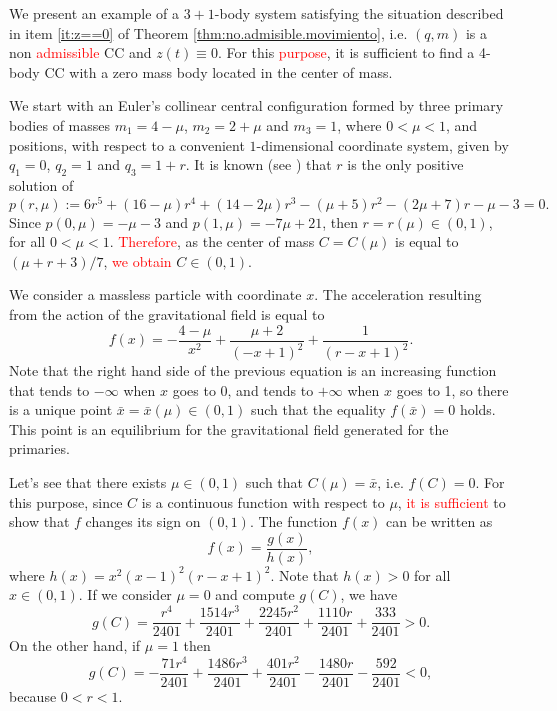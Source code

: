\documentclass[smallcondensed]{svjour3}
\begin{document}
\begin{example}
 We present an example of a $3+1$-body system satisfying the situation described in  item \ref{it:z==0} of Theorem \ref{thm:no.admisible.movimiento}, i.e. $(q,m)$ is a non \textcolor{red}{admissible} CC and $z(t)\equiv 0$. For this \textcolor{red}{purpose}, it is sufficient to find a 4-body CC with a zero mass body located in the center of mass.

 We start with an Euler's collinear central configuration formed by three primary bodies of masses $m_1 = 4-\mu$, $m_2 = 2 + \mu$ and $m_3 = 1$, where $0<\mu<1$, and positions, with respect to a convenient $1$-dimensional coordinate system,  given by $q_1 = 0$, $q_2 = 1$ and $q_3 = 1 + r$. It is known (see \cite{Moeckel:2014}) that $r$ is the only positive solution of
\[
p(r,\mu):=6 r^{5} +\left(16- \mu \right) r^{4}  +  \left( 14- 2 \mu \right) r^{3}- \left( \mu + 5\right)  r^{2}-\left( 2 \mu + 7\right) r - \mu - 3=0.
\]
Since  $p(0,\mu)=-\mu-3$ and $p(1,\mu)=-7\mu+21$, then $r=r(\mu)\in (0,1)$, for all $0<\mu<1$.
\textcolor{red}{Therefore}, as the center of mass $C=C(\mu)$ is equal to $(\mu+r+3)/7$, \textcolor{red}{we obtain} $C\in (0,1)$.

We consider a massless particle with coordinate $x$. The acceleration resulting from the action of the gravitational field is equal to
\[
f(x)= - \frac{4-\mu }{x^{2}}+\frac{\mu + 2}{\left(- x + 1\right)^{2}} + \frac{1}{\left(r - x + 1\right)^{2}}.
\]
Note that the right hand side of the previous equation is an increasing function that tends to $-\infty$ when $x$ goes to 0, and tends to $+\infty$ when $x$ goes to 1, so there is a unique point $\bar{x}=\bar{x}(\mu)\in (0,1)$ such that the equality $f(\bar{x})=0$ holds. This point is an equilibrium for the gravitational field generated for the primaries.

Let's see that there exists $ \mu \in (0,1) $ such that $ C(\mu) = \bar{x} $, i.e. $f(C)=0$. For this purpose, since $C$ is a continuous function with respect to $\mu$,  \textcolor{red}{it is sufficient} to show that $f$ changes its sign on  $(0,1)$.  The function $f(x)$ can be written as $$f(x)=\frac{g(x)}{h(x)},$$ where $h(x)=x^{2} \left(x - 1\right)^{2} \left(r - x + 1\right)^{2}$. Note that  $h(x)>0$ for all $x\in (0,1)$. If we consider $\mu=0$ and compute $g(C)$, we have
\[g(C)=\frac{r^{4}}{2401} + \frac{1514 r^{3}}{2401} + \frac{2245 r^{2}}{2401} + \frac{1110 r}{2401} + \frac{333}{2401}>0.\]
On the other hand, if  $\mu=1$ then
\[g(C)=- \frac{71 r^{4}}{2401} + \frac{1486 r^{3}}{2401} + \frac{401 r^{2}}{2401} - \frac{1480 r}{2401} - \frac{592}{2401}<0,\]
because $0<r<1$.
\end{example}
\end{document}

